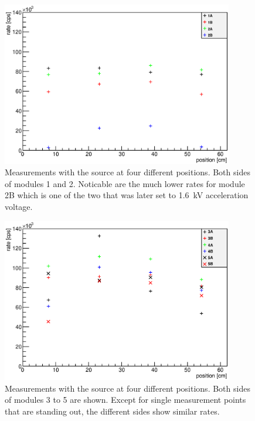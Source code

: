   
  \begin{figure}
		\centering
		\includegraphics[width = 0.9\textwidth]{graphics/analysis/12final.eps}
  	\caption[Testing of Muon Modules with Sr Source - Modules 1 \& 2]{Measurements with the source at four different positions. Both sides of modules 1 and 2. Noticable are the much lower rates for module 2B which is one of the two that was later set to \SI{1.6}{\kilo\volt} acceleration voltage. }
  	\label{fig:SrRatesPMT12}
  \end{figure}
    \begin{figure}
		\centering
		\includegraphics[width = 0.9\textwidth]{graphics/analysis/345final.eps}
  	\caption[Testing of Muon Modules with Sr Source - Modules 3 - 5]{Measurements with the source at four different positions. Both sides of modules 3 to 5 are shown. Except for single measurement points that are standing out, the different sides show similar rates. }
  	\label{fig:SrRatesPMT345}
  \end{figure}
